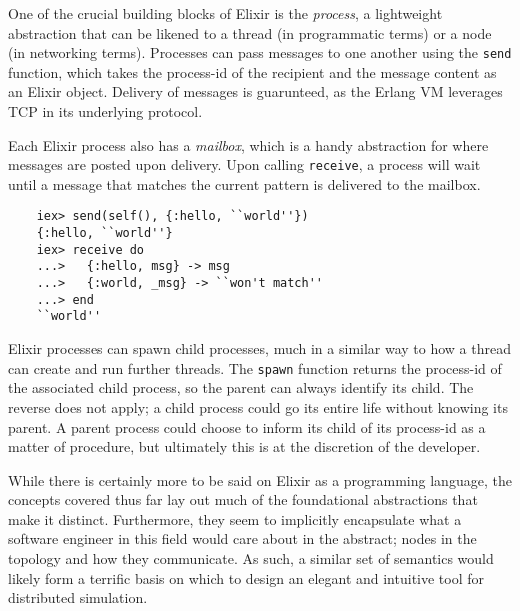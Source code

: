 One of the crucial building blocks of Elixir is the \emph{process}, a lightweight abstraction that can be likened to
a thread (in programmatic terms) or a node (in networking terms)\cite{elixir_processes}. Processes can pass messages
to one another using the \texttt{send} function, which takes the process-id of the recipient and the message content as
an Elixir object. Delivery of messages is guarunteed, as the Erlang VM leverages TCP in its underlying
protocol\cite{erlang_protocol}.

Each Elixir process also has a \emph{mailbox}, which is a handy abstraction for where messages are posted upon
delivery. Upon calling \texttt{receive}, a process will wait until a message that matches the current pattern is
delivered to the mailbox.

\begin{lstlisting}
    iex> send(self(), {:hello, ``world''})
    {:hello, ``world''}
    iex> receive do
    ...>   {:hello, msg} -> msg
    ...>   {:world, _msg} -> ``won't match''
    ...> end
    ``world''
\end{lstlisting}

Elixir processes can spawn child processes, much in a similar way to how a thread can create and run further threads.
The \texttt{spawn} function returns the process-id of the associated child process, so the parent can always identify
its child. The reverse does not apply; a child process could go its entire life without knowing its parent. A parent
process could choose to inform its child of its process-id as a matter of procedure, but ultimately this is at the
discretion of the developer.

While there is certainly more to be said on Elixir as a programming language, the concepts covered thus far lay out
much of the foundational abstractions that make it distinct. Furthermore, they seem to implicitly encapsulate what a
software engineer in this field would care about in the abstract; nodes in the topology and how they communicate.
As such, a similar set of semantics would likely form a terrific basis on which to design an elegant and intuitive
tool for distributed simulation.
